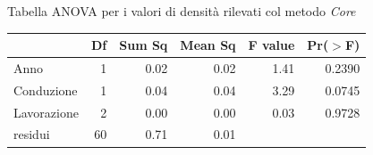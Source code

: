 \documentclass[10pt]{beamer}
\begin{document}
\begin{frame}{Tabella ANOVA per i valori di densità rilevati col metodo \emph{Core}} 
  \begin{table}[ht]
    \centering
    \label{tab:anova del modello}
    \begin{tabular}{lrrrrr}
      \hline
      & Df & Sum Sq & Mean Sq & F value & Pr($>$F) \\ 
      \hline
      Anno & 1 & 0.02 & 0.02 & 1.41 & 0.2390 \\ 
      Conduzione & 1 & 0.04 & 0.04 & 3.29 & 0.0745 \\ 
      Lavorazione & 2 & 0.00 & 0.00 & 0.03 & 0.9728 \\ 
      residui & 60 & 0.71 & 0.01 &  &  \\ 
      \hline
    \end{tabular}
  \end{table}
\end{frame}



\end{document}
